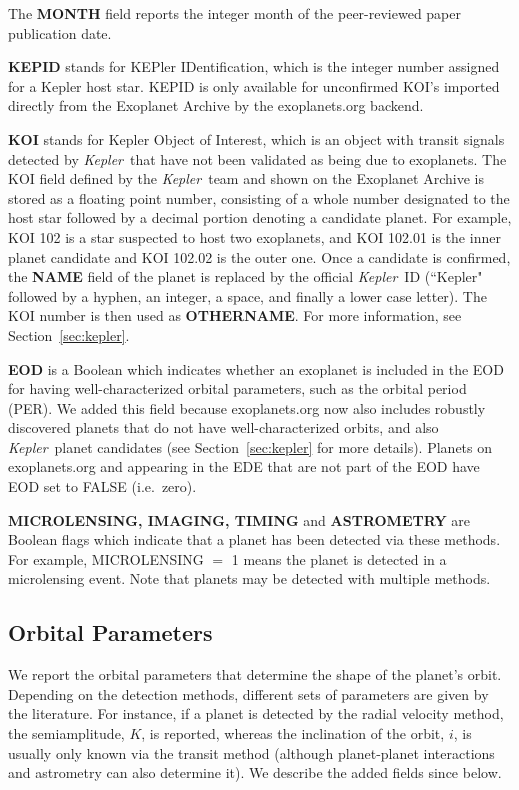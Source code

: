\documentclass[11pt,preprint]{aastex}
\def\kepler{\textit{Kepler}}
\begin{document}
\begin{CJK*}{UTF8}{gbsn}
The {\bf MONTH} field reports the integer month of the
peer-reviewed paper publication date.

{\bf KEPID} stands for KEPler IDentification, which is the integer number assigned
for a Kepler host star. KEPID is only available for unconfirmed
KOI's imported directly from the Exoplanet Archive by the
exoplanets.org backend. 

{\bf KOI} stands for Kepler Object of Interest, which is an object
with transit signals detected by \kepler\ that have not been validated
as being due to exoplanets.  The KOI field defined by the \kepler\
team and shown on the Exoplanet Archive is stored as a floating point
number, consisting of a whole number designated to the host star
followed by a decimal portion denoting a candidate planet. For example,
KOI 102 is a star suspected to host two exoplanets, and KOI 102.01 is
the inner planet candidate and KOI 102.02 is the outer one. Once a
candidate is confirmed, the {\bf NAME} field of the planet is replaced by
the official \kepler\ ID (``Kepler" followed by a hyphen, an integer,
a space, and finally a lower case letter). The KOI number is then used as
{\bf OTHERNAME}. For more information, see
Section~\ref{sec:kepler}.

{\bf EOD} is a Boolean which indicates whether an exoplanet is included
in the EOD for having well-characterized orbital
parameters, such as the orbital period (PER). We added this field because exoplanets.org
now also includes robustly discovered planets that do not have
well-characterized orbits, and also \kepler\ planet candidates (see
Section~\ref{sec:kepler} for more details).  Planets on exoplanets.org
and appearing in the EDE that are not part of the EOD have EOD set to
FALSE (i.e.\ zero).

{\bf MICROLENSING, IMAGING, TIMING} and {\bf ASTROMETRY} are Boolean flags which
indicate that a planet has been detected via these methods. For example,
MICROLENSING $=$ 1 means the planet is detected in a microlensing
event. Note that planets may be detected with multiple methods. 


\subsection{Orbital Parameters}\label{sec:orbit}

We report the orbital parameters that determine the shape of the
planet's orbit. Depending on the detection methods, different sets of
parameters are given by the literature. For instance, if a planet is
detected by the radial velocity method, the semiamplitude, $K$, is
reported, whereas the inclination of the orbit, $i$, is usually only
known via the transit method (although planet-planet interactions and
astrometry can also determine it). We describe the added fields since
\cite{Wright2011} below.


\end{CJK*}
\end{document}
